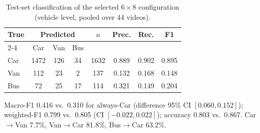 \begin{table}[t]
\centering
\caption{Test-set classification of the selected $6{\times}8$
configuration (vehicle level, pooled over 44 videos).}
\label{tab:cls}
\scriptsize
\setlength{\tabcolsep}{3.2pt}
\begin{tabular}{lccccccc}
\toprule
\textbf{True} & \multicolumn{3}{c}{\textbf{Predicted}} & \textbf{$n$} & \textbf{Prec.} & \textbf{Rec.} & \textbf{F1}\\
\cmidrule(lr){2-4}
 & Car & Van & Bus & & & & \\
\midrule
Car & 1472 & 126 & 34 & 1632 & 0.889 & 0.902 & 0.895\\
Van & 112 & 23 & 2 & 137 & 0.132 & 0.168 & 0.148\\
Bus & 72 & 25 & 17 & 114 & 0.321 & 0.149 & 0.204\\
\bottomrule
\end{tabular}

\smallskip
\parbox{\columnwidth}{\scriptsize Macro-F1 0.416 vs.\ 0.310 for
always-Car (difference 95\% CI $[0.060, 0.152]$); weighted-F1 0.799 vs.\
0.805 (CI $[-0.022, 0.022]$); accuracy 0.803 vs.\ 0.867. Car$\to$Van
7.7\%, Van$\to$Car 81.8\%, Bus$\to$Car 63.2\%.}
\end{table}

